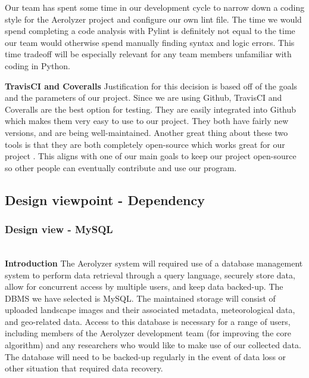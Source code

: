 \documentclass[onecolumn, draftclsnofoot,10pt, compsoc]{IEEEtran}
\begin{document}
\begin{flushleft}
\medskip

Our team has spent some time in our development cycle to narrow down a coding style for the Aerolyzer project and configure our own lint file. The time we would spend completing a code analysis with Pylint is definitely not equal to the time our team would otherwise spend manually finding syntax and logic errors. This time tradeoff will be especially relevant for any team members unfamiliar with coding in Python.

\medskip

\textbf{TravisCI and Coveralls} Justification for this decision is based off of the goals and the parameters of our project. Since we are using Github, TravisCI and Coveralls are the best option for testing. They are easily integrated into Github which makes them very easy to use to our project. They both have fairly new versions, and are being well-maintained. Another great thing about these two tools is that they are both completely open-source which works great for our project \cite{15}. This aligns with one of our main goals to keep our project open-source so other people can eventually contribute and use our program.

\bigskip

\subsection{Design viewpoint - Dependency}
\subsubsection{Design view - MySQL} \ \\
\textbf{Introduction} The Aerolyzer system will required use of a database management system to perform data retrieval through a query language, securely store data, allow for concurrent access by multiple users, and keep data backed-up. The DBMS we have selected is MySQL. The maintained storage will consist of uploaded landscape images and their associated metadata, meteorological data, and geo-related data. Access to this database is necessary for a range of users, including members of the Aerolyzer development team (for improving the core algorithm) and any researchers who would like to make use of our collected data. The database will need to be backed-up regularly in the event of data loss or other situation that required data recovery.

\medskip


\end{flushleft}
\end{document}
